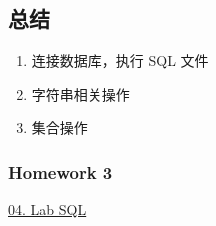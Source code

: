 \documentclass[aspectratio=169, 14pt]{beamer}
\begin{document}







    


\begin{frame}
    \section{\textcolor{darkmidnightblue}{总结}}   
    \begin{enumerate}
        \item 连接数据库，执行 SQL 文件
        \item 字符串相关操作
        \item 集合操作
    \end{enumerate}

\end{frame}

\begin{frame}
    \frametitle{Homework 3}

    \href{https://github.com/ChenZhongPu/db-swufe/tree/master/04_lab_sql}{04. Lab SQL}

\end{frame}
\end{document}
